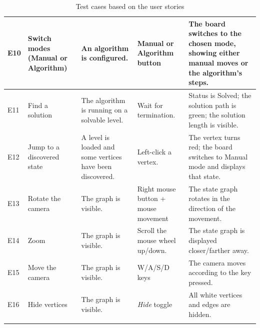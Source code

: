 \begin{longtable}{ | P{0.05\textwidth} | P{0.20\textwidth} | P{0.20\textwidth} | P{0.20\textwidth} | P{0.20\textwidth} | }
E10
& Switch modes (Manual or Algorithm)
& An algorithm is configured.
& Manual or Algorithm button
& The board switches to the chosen mode, showing either manual moves or the algorithm's steps.
\\ \hline

E11
& Find a solution
& The algorithm is running on a solvable level.
& Wait for termination.
& Status is Solved; the solution path is green; the solution length is visible.
\\ \hline

E12
& Jump to a discovered state
& A level is loaded and some vertices have been discovered.
& Left-click a vertex.
& The vertex turns red; the board switches to Manual mode and displays that state.
\\ \hline

E13
& Rotate the camera
& The graph is visible.
& Right mouse button + mouse movement
& The state graph rotates in the direction of the movement.
\\ \hline

E14
& Zoom
& The graph is visible.
& Scroll the mouse wheel up/down.
& The state graph is displayed closer/farther away.
\\ \hline

E15
& Move the camera
& The graph is visible.
& W/A/S/D keys
& The camera moves according to the key pressed.
\\ \hline

E16
& Hide vertices
& The graph is visible.
& \textit{Hide} toggle
& All white vertices and edges are hidden.
\\ \hline

\caption{Test cases based on the user stories}
\label{tab:user-tests}
\end{longtable}
